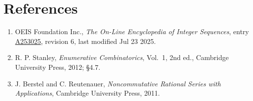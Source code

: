 \documentclass[11pt]{article}
\theoremstyle{definition}
\begin{document}
\section{References}

\begin{enumerate}

\item OEIS Foundation Inc., \emph{The On-Line Encyclopedia of Integer Sequences}, entry \href{https://oeis.org/A253025}{A253025}, revision 6, last modified Jul 23 2025.

\item R. P. Stanley, \emph{Enumerative Combinatorics}, Vol.~1, 2nd ed., Cambridge University Press, 2012; \S4.7.

\item J. Berstel and C. Reutenauer, \emph{Noncommutative Rational Series with Applications}, Cambridge University Press, 2011.

\end{enumerate}
\end{document}
